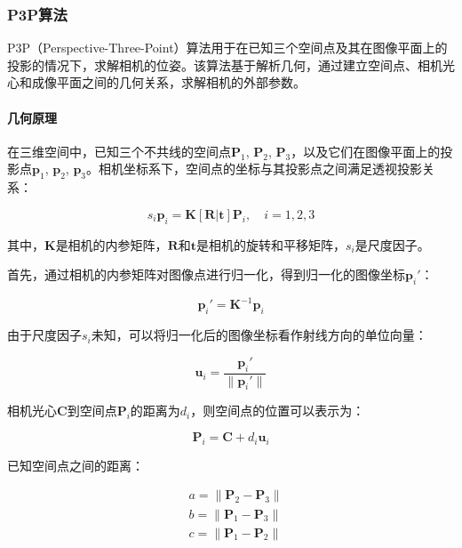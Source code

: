 \subsubsection{P3P算法}

P3P（Perspective-Three-Point）算法\cite{p3p}用于在已知三个空间点及其在图像平面上的投影的情况下，求解相机的位姿。该算法基于解析几何，通过建立空间点、相机光心和成像平面之间的几何关系，求解相机的外部参数。

\paragraph{几何原理}

在三维空间中，已知三个不共线的空间点$\mathbf{P}_1$, $\mathbf{P}_2$, $\mathbf{P}_3$，以及它们在图像平面上的投影点$\mathbf{p}_1$, $\mathbf{p}_2$, $\mathbf{p}_3$。相机坐标系下，空间点的坐标与其投影点之间满足透视投影关系：

\begin{equation}
	s_i \mathbf{p}_i = \mathbf{K} [\mathbf{R} | \mathbf{t}] \mathbf{P}_i, \quad i = 1,2,3
\end{equation}


其中，$\mathbf{K}$是相机的内参矩阵，$\mathbf{R}$和$\mathbf{t}$是相机的旋转和平移矩阵，$s_i$是尺度因子。


首先，通过相机的内参矩阵对图像点进行归一化，得到归一化的图像坐标$\mathbf{p}_i'$：

\begin{equation}
	\mathbf{p}_i' = \mathbf{K}^{-1} \mathbf{p}_i
\end{equation}


由于尺度因子$s_i$未知，可以将归一化后的图像坐标看作射线方向的单位向量：

\begin{equation}
	\mathbf{u}_i = \frac{\mathbf{p}_i'}{\|\mathbf{p}_i'\|}
\end{equation}


相机光心$\mathbf{C}$到空间点$\mathbf{P}_i$的距离为$d_i$，则空间点的位置可以表示为：

\begin{equation}
	\mathbf{P}_i = \mathbf{C} + d_i \mathbf{u}_i
\end{equation}

已知空间点之间的距离：

\begin{equation}
	\begin{aligned}
		& a = \|\mathbf{P}_2 - \mathbf{P}_3\| \\
		& b = \|\mathbf{P}_1 - \mathbf{P}_3\| \\
		& c = \|\mathbf{P}_1 - \mathbf{P}_2\|
	\end{aligned}
\end{equation}

